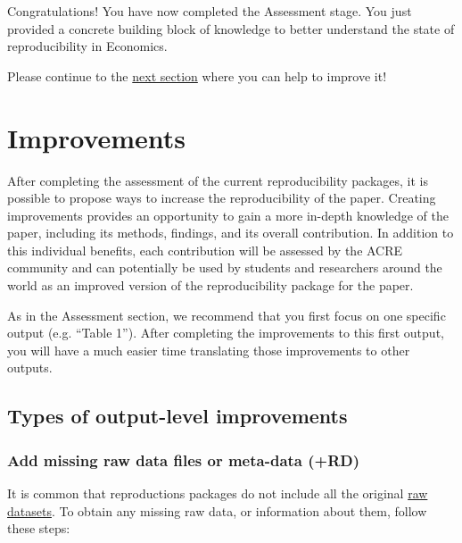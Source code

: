 \documentclass[]{book}
\begin{document}
Congratulations! You have now completed the Assessment stage. You just provided a concrete building block of knowledge to better understand the state of reproducibility in Economics.

Please continue to the \protect\hyperlink{improvements}{next section} where you can help to improve it!

\hypertarget{improvements}{%
\chapter{Improvements}\label{improvements}}

After completing the assessment of the current reproducibility packages, it is possible to propose ways to increase the reproducibility of the paper. Creating improvements provides an opportunity to gain a more in-depth knowledge of the paper, including its methods, findings, and its overall contribution. In addition to this individual benefits, each contribution will be assessed by the ACRE community and can potentially be used by students and researchers around the world as an improved version of the reproducibility package for the paper.

As in the Assessment section, we recommend that you first focus on one specific output (e.g. ``Table 1''). After completing the improvements to this first output, you will have a much easier time translating those improvements to other outputs.

\hypertarget{types-of-output-level-improvements}{%
\section{Types of output-level improvements}\label{types-of-output-level-improvements}}

\hypertarget{rd}{%
\subsection{Add missing raw data files or meta-data (+RD)}\label{rd}}

It is common that reproductions packages do not include all the original \protect\hyperlink{describe-inputs}{raw datasets}. To obtain any missing raw data, or information about them, follow these steps:
\end{document}

